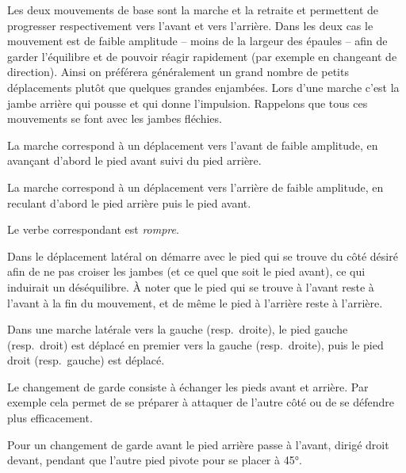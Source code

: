 Les deux mouvements de base sont la marche et la retraite et permettent de progresser respectivement vers l'avant et vers l'arrière.
Dans les deux cas le mouvement est de faible amplitude -- moins de la largeur des épaules -- afin de garder l'équilibre et de pouvoir réagir rapidement (par exemple en changeant de direction).
Ainsi on préférera généralement un grand nombre de petits déplacements plutôt que quelques grandes enjambées.
Lors d'une marche c'est la jambe arrière qui pousse et qui donne l'impulsion.
Rappelons que tous ces mouvements se font avec les jambes fléchies.


\begin{definition}[Marche]

	La marche correspond à un déplacement vers l'avant de faible amplitude, en avançant d'abord le pied avant suivi du pied arrière.
\end{definition}


\begin{definition}[Retraite]

	La marche correspond à un déplacement vers l'arrière de faible amplitude, en reculant d'abord le pied arrière puis le pied avant.

	Le verbe correspondant est \emph{rompre}.
\end{definition}


Dans le déplacement latéral on démarre avec le pied qui se trouve du côté désiré afin de ne pas croiser les jambes (et ce quel que soit le pied avant), ce qui induirait un déséquilibre.
À noter que le pied qui se trouve à l'avant reste à l'avant à la fin du mouvement, et de même le pied à l'arrière reste à l'arrière.

\begin{definition}

	Dans une marche latérale vers la gauche (resp.\ droite), le pied gauche (resp.\ droit) est déplacé en premier vers la gauche (resp.\ droite), puis le pied droit (resp.\ gauche) est déplacé.
\end{definition}


Le changement de garde consiste à échanger les pieds avant et arrière.
Par exemple cela permet de se préparer à attaquer de l'autre côté ou de se défendre plus efficacement.


\begin{definition}
	\label{dep:def:changement-garde-avant}

	Pour un changement de garde avant le pied arrière passe à l'avant, dirigé droit devant, pendant que l'autre pied pivote pour se placer à 45°.
\end{definition}


